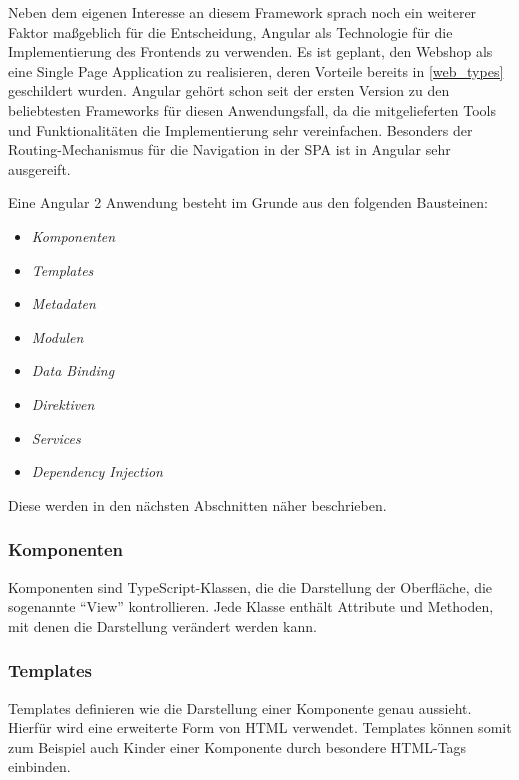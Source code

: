 Neben dem eigenen Interesse an diesem Framework sprach noch ein weiterer Faktor maßgeblich für die Entscheidung, Angular als Technologie für die Implementierung des Frontends zu verwenden.
Es ist geplant, den Webshop als eine Single Page Application zu realisieren, deren Vorteile bereits in \cref{web_types} geschildert wurden.
Angular gehört schon seit der ersten Version zu den beliebtesten Frameworks für diesen Anwendungsfall, da die mitgelieferten Tools und Funktionalitäten die Implementierung sehr vereinfachen.
Besonders der Routing-Mechanismus für die Navigation in der \acs{SPA} ist in Angular sehr ausgereift.

Eine Angular 2 Anwendung besteht im Grunde aus den folgenden Bausteinen\cite{Angular.io2017}:

\begin{itemize}
	\item \textit{Komponenten}
	\item \textit{Templates} 
	\item \textit{Metadaten}
	\item \textit{Modulen}
	\item \textit{Data Binding} 
	\item \textit{Direktiven}
	\item \textit{Services}
	\item \textit{Dependency Injection}
\end{itemize}

Diese werden in den nächsten Abschnitten näher beschrieben.

\subsubsection{Komponenten}
Komponenten sind TypeScript-Klassen, die die Darstellung der Oberfläche, die sogenannte \enquote{View} kontrollieren.
Jede Klasse enthält Attribute und Methoden, mit denen die Darstellung verändert werden kann.

\subsubsection{Templates}
Templates definieren wie die Darstellung einer Komponente genau aussieht.
Hierfür wird eine erweiterte Form von \acs{HTML} verwendet. Templates können somit zum Beispiel auch Kinder einer Komponente durch besondere HTML-Tags einbinden.

